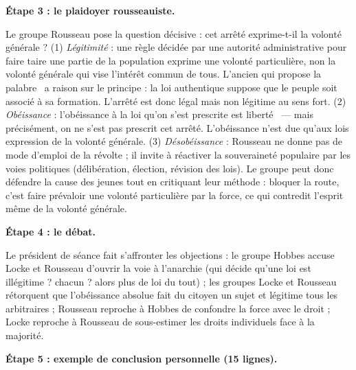 \documentclass[11pt]{article}
\begin{document}
\begin{exoresolu}
\textbf{Étape 3 : le plaidoyer rousseauiste.}\par
Le groupe Rousseau pose la question décisive : cet arrêté exprime-t-il la volonté générale ? (1) \emph{Légitimité} : une règle décidée par une autorité administrative pour faire taire une partie de la population exprime une volonté particulière, non la volonté générale qui vise l'intérêt commun de tous. L'ancien qui propose \guillemotleft la palabre \guillemotright\ a raison sur le principe : la loi authentique suppose que le peuple soit associé à sa formation. L'arrêté est donc légal mais non légitime au sens fort. (2) \emph{Obéissance} : \guillemotleft l'obéissance à la loi qu'on s'est prescrite est liberté \guillemotright\ — mais précisément, on ne s'est pas prescrit cet arrêté. L'obéissance n'est due qu'aux lois expression de la volonté générale. (3) \emph{Désobéissance} : Rousseau ne donne pas de mode d'emploi de la révolte ; il invite à réactiver la souveraineté populaire par les voies politiques (délibération, élection, révision des lois). Le groupe peut donc défendre la cause des jeunes tout en critiquant leur méthode : bloquer la route, c'est faire prévaloir une volonté particulière par la force, ce qui contredit l'esprit même de la volonté générale.\par
\textbf{Étape 4 : le débat.}\par
Le président de séance fait s'affronter les objections : le groupe Hobbes accuse Locke et Rousseau d'ouvrir la voie à l'anarchie (qui décide qu'une loi est \guillemotleft illégitime \guillemotright ? chacun ? alors plus de loi du tout) ; les groupes Locke et Rousseau rétorquent que l'obéissance absolue fait du citoyen un sujet et légitime tous les arbitraires ; Rousseau reproche à Hobbes de confondre la force avec le droit ; Locke reproche à Rousseau de sous-estimer les droits individuels face à la majorité.\par
\textbf{Étape 5 : exemple de conclusion personnelle (15 lignes).}\par

\end{exoresolu}
\end{document}
